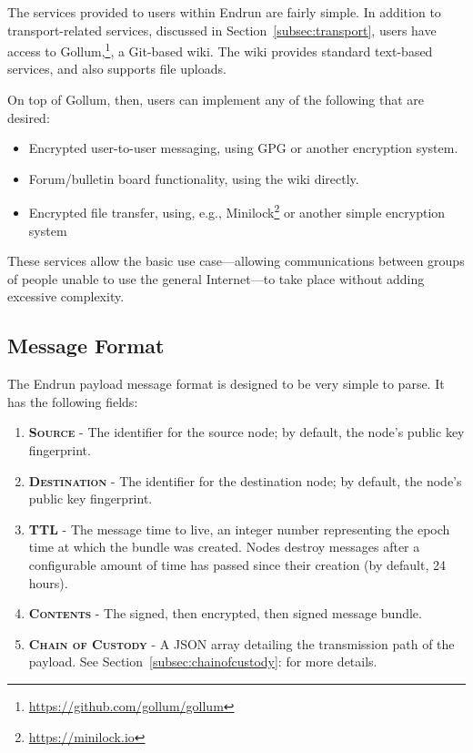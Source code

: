 \documentclass[12pt]{article}
\begin{document}
  The services provided to users within Endrun are fairly simple. In addition to transport-related services, discussed in Section~\ref{subsec:transport}, users have access to Gollum,\footnote{\url{https://github.com/gollum/gollum}}, a Git-based wiki. The wiki provides standard text-based services, and also supports file uploads.
  
  On top of Gollum, then, users can implement any of the following that are desired:
  \begin{itemize}
    \item Encrypted user-to-user messaging, using GPG or another encryption system.
    \item Forum/bulletin board functionality, using the wiki directly.
    \item Encrypted file transfer, using, e.g., Minilock\footnote{\url{https://minilock.io}} or another simple encryption system
  \end{itemize}
  
  These services allow the basic use case---allowing communications between groups of people unable to use the general Internet---to take place without adding excessive complexity.
  
  \subsection{Message Format}
  
  The Endrun payload message format is designed to be very simple to parse. It has the following fields:
  
  \begin{enumerate}
    \item \textbf{\textsc{Source}} - The identifier for the source node; by default, the node's public key fingerprint. 
    \item \textbf{\textsc{Destination}} - The identifier for the destination node; by default, the node's public key fingerprint.
    \item \textbf{\textsc{TTL}} - The message time to live, an integer number representing the epoch time at which the bundle was created. Nodes destroy messages after a configurable amount of time has passed since their creation (by default, 24 hours).
    \item \textbf{\textsc{Contents}} - The signed, then encrypted, then signed message bundle.
    \item \textbf{\textsc{Chain of Custody}} - A JSON array detailing the transmission path of the payload. See Section~\ref{subsec:chainofcustody}: for more details.

    \end{enumerate}
    
\end{document}
